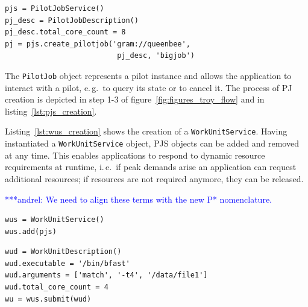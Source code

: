 \documentclass[conference,final]{IEEEtran}
\newcommand{\alnote}[1]{ {\textcolor{blue} { ***andrel: #1 }}}
\newcommand{\alnote}[1]{}
\begin{document}
\lstset{
language=Python,
frame=single,
captionpos=b,
stringstyle=\ttfamily,
basicstyle=\scriptsize\ttfamily
}

\noindent\begin{minipage}{0.47 \textwidth}
\begin{lstlisting}[caption={\textbf{PilotJob Creation:} Instantiation of a Pilot Job Service using a Pilot Job Description.}, label={lst:pjs_creation}]
pjs = PilotJobService()
pj_desc = PilotJobDescription()
pj_desc.total_core_count = 8
pj = pjs.create_pilotjob('gram://queenbee', 
                          pj_desc, 'bigjob')
\end{lstlisting}
\end{minipage}

The \texttt{PilotJob} object represents a pilot instance and allows the 
application to interact with a pilot, e.\,g.\ to query its state or to cancel 
it. The process of PJ creation is depicted in step 1-3 of 
figure~\ref{fig:figures_troy_flow} and in listing~\ref{lst:pjs_creation}.

Listing~\ref{lst:wus_creation} shows the creation of a \texttt{WorkUnitService}.
Having instantiated a \texttt{WorkUnitService} object, PJS objects can be added
and removed at any time. This enables applications to respond to dynamic
resource requirements at runtime, i.\,e.\ if peak demands arise an application
can request additional resources; if resources are not required anymore, they
can be released.

\alnote{We need to align these terms with the new P* nomenclature.}
\noindent\begin{minipage}{0.47 \textwidth}
\begin{lstlisting}[caption={\textbf{WorkUnitService Creation:} Instantiation of 
	a \texttt{WorkUnitService} using a reference to the 
	\texttt{PilotJobService}.}, 
	label={lst:wus_creation}]
wus = WorkUnitService()
wus.add(pjs)
\end{lstlisting}
\end{minipage}

\noindent\begin{minipage}{0.47 \textwidth}
\begin{lstlisting}[caption={\textbf{WorkUnit Submission:} Instantiation and 
	submission of a \texttt{WorkUnitDescription}.}, label={lst:submission}] 
wud = WorkUnitDescription()
wud.executable = '/bin/bfast'
wud.arguments = ['match', '-t4', '/data/file1']
wud.total_core_count = 4
wu = wus.submit(wud)
\end{lstlisting}
\end{minipage}
\end{document}
